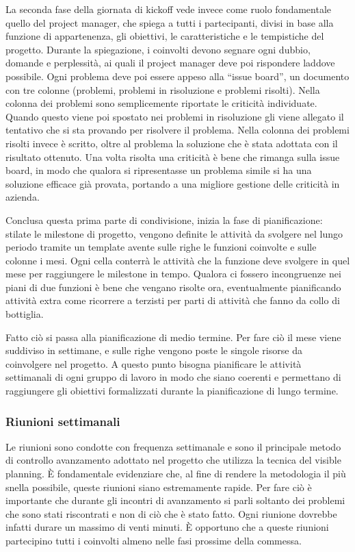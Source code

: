 \begin{multicols}{2}
	La seconda fase della giornata di kickoff vede invece come ruolo fondamentale quello del project manager, che spiega a tutti i partecipanti, divisi in base alla funzione di appartenenza, gli obiettivi, le caratteristiche e le tempistiche del progetto. Durante la spiegazione, i coinvolti devono segnare ogni dubbio, domande e perplessità, ai quali il project manager deve poi rispondere laddove possibile. Ogni problema deve poi essere appeso alla “issue board”, un documento con tre colonne (problemi, problemi in risoluzione e problemi risolti). Nella colonna dei problemi sono semplicemente riportate le criticità individuate. Quando questo viene poi spostato nei problemi in risoluzione gli viene allegato il tentativo che si sta provando per risolvere il problema. Nella colonna dei problemi risolti invece è scritto, oltre al problema la soluzione che è stata adottata con il risultato ottenuto. Una volta risolta una criticità è bene che rimanga sulla issue board, in modo che qualora si ripresentasse un problema simile si ha una soluzione efficace già provata, portando a una migliore gestione delle criticità in azienda.

	Conclusa questa prima parte di condivisione, inizia la fase di pianificazione: stilate le milestone di progetto, vengono definite le attività da svolgere nel lungo periodo tramite un template avente sulle righe le funzioni coinvolte e sulle colonne i mesi. Ogni cella conterrà le attività che la funzione deve svolgere in quel mese per raggiungere le milestone in tempo. Qualora ci fossero incongruenze nei piani di due funzioni è bene che vengano risolte ora, eventualmente pianificando attività extra come ricorrere a terzisti per parti di attività che fanno da collo di bottiglia.

	Fatto ciò si passa alla pianificazione di medio termine. Per fare ciò il mese viene suddiviso in settimane, e sulle righe vengono poste le singole risorse da coinvolgere nel progetto. A questo punto bisogna pianificare le attività settimanali di ogni gruppo di lavoro in modo che siano coerenti e permettano di raggiungere gli obiettivi formalizzati durante la pianificazione di lungo termine.

	\subsubsection{Riunioni settimanali}
	Le riunioni sono condotte con frequenza settimanale e sono il principale metodo di controllo avanzamento adottato nel progetto che utilizza la tecnica del visible planning. È fondamentale evidenziare che, al fine di rendere la metodologia il più snella possibile, queste riunioni siano estremamente rapide. Per fare ciò è importante che durante gli incontri di avanzamento si parli soltanto dei problemi che sono stati riscontrati e non di ciò che è stato fatto. Ogni riunione dovrebbe infatti durare un massimo di venti minuti. È opportuno che a queste riunioni partecipino tutti i coinvolti almeno nelle fasi prossime della commessa.


\end{multicols}
